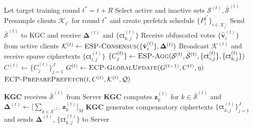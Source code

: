     Let target training round $t^* = t + R$\;
    Select active and inactive sets $\mathcal{S}^{(t)}, \bar{\mathcal{S}}^{(t)}$\;
    Presample clients $\mathcal{K}_{t^*}$ for round $t^*$ and create prefetch schedule $\{P_i^{t^*}\}_{i \in \mathcal{K}_{t^*}}$\;
    Send $\bar{\mathcal{S}}^{(t)}$ to KGC and receive $\mathbf{\Delta}^{(t)}$ and $\{\mathsf{ct}_{k,j}^{(t)}\}$\;
    Receive obfuscated votes $\{\hat{\mathbf{v}}_i^{(t)}\}$ from active clients\;
    $\mathcal{K}^{(t)} \leftarrow \textsc{ESP-Consensus}(\{\hat{\mathbf{v}}_i^{(t)}\}, \mathbf{\Delta}^{(t)})$\;
    Broadcast $\mathcal{K}^{(t)}$ and receive sparse ciphertexts $\{\mathsf{ct}_{i,j}^{(t)}\}$\;
    $\{C_j^{(t)}\} \leftarrow \textsc{ESP-Agg}(\mathcal{S}^{(t)}, \bar{\mathcal{S}}^{(t)}, \{\mathsf{ct}_{i,j}^{(t)}\}, \{\mathsf{ct}_{k,j}^{(t)}\})$\;
    $C^{(t)} \leftarrow \{C_j^{(t)}\}_{j=1}^J$\;
    $G^{(t)} \leftarrow \textsc{ECP-GlobalUpdate}(G^{(t-1)}, C^{(t)}, \eta)$\;
    $\textsc{ECP-PreparePrefetch}(t, C^{(t)}, \mathcal{K}^{(t)}, \mathcal{Q})$\;

    \textbf{KGC} receives $\bar{\mathcal{S}}^{(t)}$ from Server\;
    \textbf{KGC} computes $\mathbf{z}_k^{(t)}$ for $k \in \bar{\mathcal{S}}^{(t)}$ and $\mathbf{\Delta}^{(t)} \leftarrow \bigl[\sum_{k \in \bar{\mathcal{S}}^{(t)}} \mathbf{z}_k^{(t)}\bigr]_M$\;
    \textbf{KGC} generates compensatory ciphertexts $\{\mathsf{ct}_{k,j}^{(t)}\}_{j=1}^J$ and sends $\mathbf{\Delta}^{(t)}$, $\{\mathsf{ct}_{k,j}^{(t)}\}$ to Server\;

